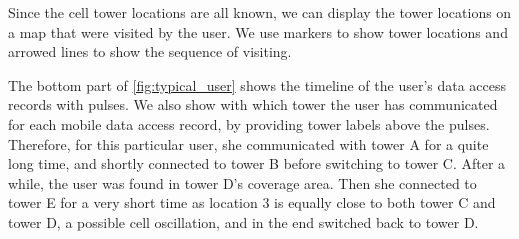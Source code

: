 Since the cell tower locations are all known,
we can display the tower locations on a map that were visited by the user.
We use markers to show tower locations and arrowed lines to show the sequence of visiting.

The bottom part of \autoref{fig:typical_user} shows the timeline of the user's data access records with pulses.
We also show with which tower the user has communicated for each mobile data access record, by providing tower labels above the pulses.
Therefore, for this particular user, she communicated with tower A for a quite long time,
and shortly connected to tower B before switching to tower C.
After a while, the user was found in tower D's coverage area.
Then she connected to tower E for a very short time as location 3 is equally close to both tower C and tower D, \ie a possible cell oscillation, and in the end switched back to tower D.



